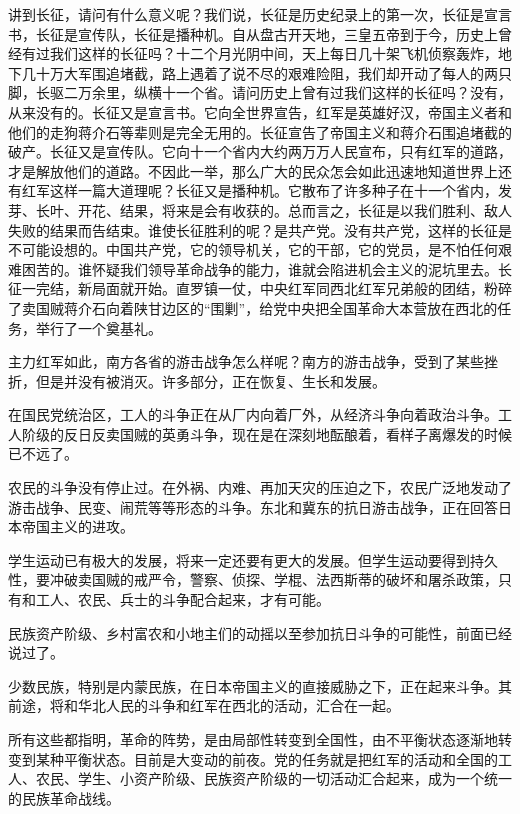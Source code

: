 讲到长征，请问有什么意义呢？我们说，长征是历史纪录上的第一次，长征是宣言书，长征是宣传队，长征是播种机。自从盘古开天地，三皇五帝到于今，历史上曾经有过我们这样的长征吗？十二个月光阴中间，天上每日几十架飞机侦察轰炸，地下几十万大军围追堵截，路上遇着了说不尽的艰难险阻，我们却开动了每人的两只脚，长驱二万余里，纵横十一个省。请问历史上曾有过我们这样的长征吗？没有，从来没有的。长征又是宣言书。它向全世界宣告，红军是英雄好汉，帝国主义者和他们的走狗蒋介石等辈则是完全无用的。长征宣告了帝国主义和蒋介石围追堵截的破产。长征又是宣传队。它向十一个省内大约两万万人民宣布，只有红军的道路，才是解放他们的道路。不因此一举，那么广大的民众怎会如此迅速地知道世界上还有红军这样一篇大道理呢？长征又是播种机。它散布了许多种子在十一个省内，发芽、长叶、开花、结果，将来是会有收获的。总而言之，长征是以我们胜利、敌人失败的结果而告结束。谁使长征胜利的呢？是共产党。没有共产党，这样的长征是不可能设想的。中国共产党，它的领导机关，它的干部，它的党员，是不怕任何艰难困苦的。谁怀疑我们领导革命战争的能力，谁就会陷进机会主义的泥坑里去。长征一完结，新局面就开始。直罗镇一仗，中央红军同西北红军兄弟般的团结，粉碎了卖国贼蒋介石向着陕甘边区的“围剿”，给党中央把全国革命大本营放在西北的任务，举行了一个奠基礼。

主力红军如此，南方各省的游击战争怎么样呢？南方的游击战争，受到了某些挫折，但是并没有被消灭。许多部分，正在恢复、生长和发展。

在国民党统治区，工人的斗争正在从厂内向着厂外，从经济斗争向着政治斗争。工人阶级的反日反卖国贼的英勇斗争，现在是在深刻地酝酿着，看样子离爆发的时候已不远了。

农民的斗争没有停止过。在外祸、内难、再加天灾的压迫之下，农民广泛地发动了游击战争、民变、闹荒等等形态的斗争。东北和冀东的抗日游击战争，正在回答日本帝国主义的进攻。

学生运动已有极大的发展，将来一定还要有更大的发展。但学生运动要得到持久性，要冲破卖国贼的戒严令，警察、侦探、学棍、法西斯蒂的破坏和屠杀政策，只有和工人、农民、兵士的斗争配合起来，才有可能。

民族资产阶级、乡村富农和小地主们的动摇以至参加抗日斗争的可能性，前面已经说过了。

少数民族，特别是内蒙民族，在日本帝国主义的直接威胁之下，正在起来斗争。其前途，将和华北人民的斗争和红军在西北的活动，汇合在一起。

所有这些都指明，革命的阵势，是由局部性转变到全国性，由不平衡状态逐渐地转变到某种平衡状态。目前是大变动的前夜。党的任务就是把红军的活动和全国的工人、农民、学生、小资产阶级、民族资产阶级的一切活动汇合起来，成为一个统一的民族革命战线。

